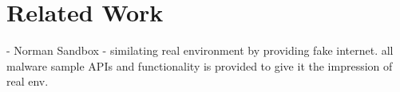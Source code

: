 \chapter{Related Work}

- Norman Sandbox - similating real environment by providing fake internet. all malware sample APIs and functionality is provided to give it the impression of real env.